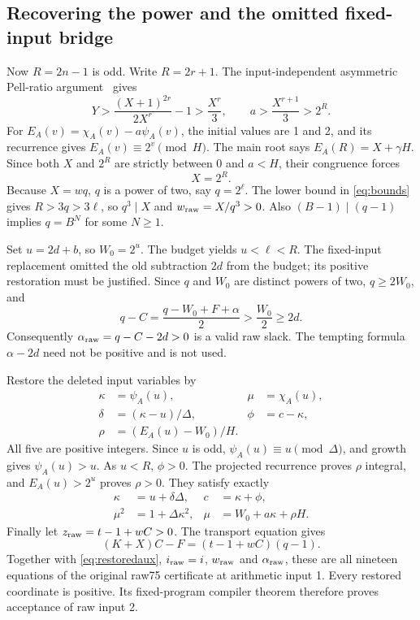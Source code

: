 \documentclass[11pt,a4paper]{article}
\theoremstyle{definition}\newtheorem{definition}[theorem]{Definition}
\begin{document}
\subsection{Recovering the power and the omitted fixed-input bridge}
Now $R=2n-1$ is odd. Write $R=2r+1$. The input-independent
asymmetric Pell-ratio argument~\cite{asymmetric} gives
\[
 Y>\frac{(X+1)^{2r}}{2X^r}-1>\frac{X^r}{3},\qquad
 a>\frac{X^{r+1}}3>2^R.
\]
For $E_A(v)=\chi_A(v)-a\psi_A(v)$, the initial values are 1 and 2,
and its recurrence gives $E_A(v)\equiv2^v\pmod H$.
The main root says $E_A(R)=X+\gamma H$. Since both $X$ and $2^R$
are strictly between 0 and $a<H$, their congruence forces
\begin{equation}\label{eq:power}
 X=2^R.
\end{equation}
Because $X=wq$, $q$ is a power of two, say $q=2^\ell$.
The lower bound in \eqref{eq:bounds} gives $R>3q>3\ell$,
so $q^3\mid X$ and $w_{\rm raw}=X/q^3>0$.
Also $(B-1)\mid(q-1)$ implies $q=B^N$ for some $N\ge1$.

Set $u=2d+b$, so $W_0=2^u$. The budget yields $u<\ell<R$.
The fixed-input replacement omitted the old subtraction $2d$ from
the budget; its positive restoration must be justified. Since
$q$ and $W_0$ are distinct powers of two, $q\ge2W_0$, and
\begin{equation}\label{eq:rawslack}
 q-C=\frac{q-W_0+F+\alpha}{2}>\frac{W_0}{2}\ge2d.
\end{equation}
Consequently $\alpha_{\rm raw}=q-C-2d>0$ is a valid raw slack.
The tempting formula $\alpha-2d$ need not be positive and is not used.

Restore the deleted input variables by
\begin{align*}
 \kappa&=\psi_A(u),&\mu&=\chi_A(u),\\
 \delta&=(\kappa-u)/\Delta,&\phi&=c-\kappa,\\
 \rho&=(E_A(u)-W_0)/H.
\end{align*}
All five are positive integers. Since $u$ is odd,
$\psi_A(u)\equiv u\pmod\Delta$, and growth gives
$\psi_A(u)>u$. As $u<R$, $\phi>0$.
The projected recurrence proves $\rho$ integral, and
$E_A(u)>2^u$ proves $\rho>0$. They satisfy exactly
\begin{align*}
 \kappa&=u+\delta\Delta,&c&=\kappa+\phi,\\
 \mu^2&=1+\Delta\kappa^2,&
 \mu&=W_0+a\kappa+\rho H.
\end{align*}
Finally let $z_{\rm raw}=t-1+wC>0$. The transport equation gives
\[
 (K+X)C-F=(t-1+wC)(q-1).
\]
Together with \eqref{eq:restoredaux}, $i_{\rm raw}=i$,
$w_{\rm raw}$ and $\alpha_{\rm raw}$, these are all nineteen
equations of the original raw75 certificate at arithmetic input 1.
Every restored coordinate is positive. Its fixed-program compiler
theorem therefore proves acceptance of raw input 2.
\end{document}
